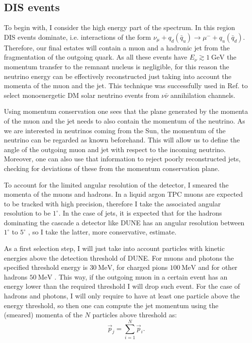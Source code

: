 \subsection{DIS events}

To begin with, I consider the high energy part of the spectrum. In this region DIS events dominate, i.e. interactions of the form $\nu_{\mu} + q_{d}(\bar{q}_{u}) \rightarrow \mu^{-} + q_{u}(\bar{q}_{d})$. Therefore, our final estates will contain a muon and a hadronic jet from the fragmentation of the outgoing quark. As all these events have $E_{\nu} \gtrsim 1 \ \mathrm{GeV}$ the momentum transfer to the remnant nucleus is negligible, for this reason the neutrino energy can be effectively reconstructed just taking into account the momenta of the muon and the jet. This technique was successfully used in Ref. \cite{Rott2019} to select monoenergetic DM solar neutrino events from $\nu \bar{\nu}$ annihilation channels.

Using momentum conservation one sees that the plane generated by the momenta of the muon and the jet needs to also contain the momentum of the neutrino. As we are interested in neutrinos coming from the Sun, the momentum of the neutrino can be regarded as known beforehand. This will allow us to define the angle of the outgoing muon and jet with respect to the incoming neutrino. Moreover, one can also use that information to reject poorly reconstructed jets, checking for deviations of these from the momentum conservation plane.

To account for the limited angular resolution of the detector, I smeared the momenta of the muons and hadrons. In a liquid argon TPC muons are expected to be tracked with high precision, therefore I take the associated angular resolution to be $1^{\circ}$. In the case of jets, it is expected that for the hadrons dominating the cascade a detector like DUNE has an angular resolution between $1^{\circ}$ to $5^{\circ}$ \cite{DUNE2020TDR2}, so I take the latter, more conservative, estimate.

As a first selection step, I will just take into account particles with kinetic energies above the detection threshold of DUNE. For muons and photons the specified threshold energy is $30 \ \mathrm{MeV}$, for charged pions $100 \ \mathrm{MeV}$ and for other hadrons $50 \ \mathrm{MeV}$ \cite{DUNE2020TDR2}. This way, if the outgoing muon in a certain event has an energy lower than the required threshold I will drop such event. For the case of hadrons and photons, I will only require to have at least one particle above the energy threshold, so then one can compute the jet momentum using the (smeared) momenta of the $N$ particles above threshold as:
\begin{equation}
	\vec{p}_{j} = \sum_{i=1}^{N} \vec{p}_{i}.
\end{equation}

